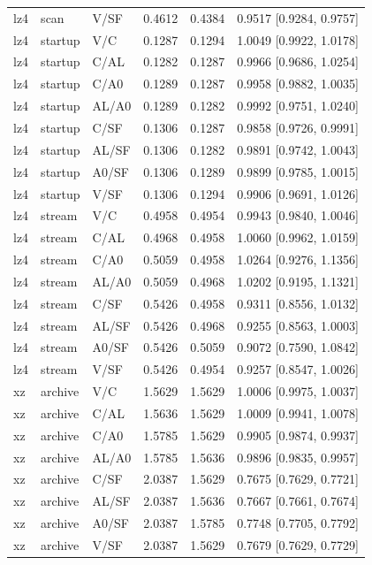 \begin{longtable}{lllrrl}
lz4 & scan & V/SF & 0.4612 & 0.4384 & 0.9517 [0.9284, 0.9757] \\
lz4 & startup & V/C & 0.1287 & 0.1294 & 1.0049 [0.9922, 1.0178] \\
lz4 & startup & C/AL & 0.1282 & 0.1287 & 0.9966 [0.9686, 1.0254] \\
lz4 & startup & C/A0 & 0.1289 & 0.1287 & 0.9958 [0.9882, 1.0035] \\
lz4 & startup & AL/A0 & 0.1289 & 0.1282 & 0.9992 [0.9751, 1.0240] \\
lz4 & startup & C/SF & 0.1306 & 0.1287 & 0.9858 [0.9726, 0.9991] \\
lz4 & startup & AL/SF & 0.1306 & 0.1282 & 0.9891 [0.9742, 1.0043] \\
lz4 & startup & A0/SF & 0.1306 & 0.1289 & 0.9899 [0.9785, 1.0015] \\
lz4 & startup & V/SF & 0.1306 & 0.1294 & 0.9906 [0.9691, 1.0126] \\
lz4 & stream & V/C & 0.4958 & 0.4954 & 0.9943 [0.9840, 1.0046] \\
lz4 & stream & C/AL & 0.4968 & 0.4958 & 1.0060 [0.9962, 1.0159] \\
lz4 & stream & C/A0 & 0.5059 & 0.4958 & 1.0264 [0.9276, 1.1356] \\
lz4 & stream & AL/A0 & 0.5059 & 0.4968 & 1.0202 [0.9195, 1.1321] \\
lz4 & stream & C/SF & 0.5426 & 0.4958 & 0.9311 [0.8556, 1.0132] \\
lz4 & stream & AL/SF & 0.5426 & 0.4968 & 0.9255 [0.8563, 1.0003] \\
lz4 & stream & A0/SF & 0.5426 & 0.5059 & 0.9072 [0.7590, 1.0842] \\
lz4 & stream & V/SF & 0.5426 & 0.4954 & 0.9257 [0.8547, 1.0026] \\
xz & archive & V/C & 1.5629 & 1.5629 & 1.0006 [0.9975, 1.0037] \\
xz & archive & C/AL & 1.5636 & 1.5629 & 1.0009 [0.9941, 1.0078] \\
xz & archive & C/A0 & 1.5785 & 1.5629 & 0.9905 [0.9874, 0.9937] \\
xz & archive & AL/A0 & 1.5785 & 1.5636 & 0.9896 [0.9835, 0.9957] \\
xz & archive & C/SF & 2.0387 & 1.5629 & 0.7675 [0.7629, 0.7721] \\
xz & archive & AL/SF & 2.0387 & 1.5636 & 0.7667 [0.7661, 0.7674] \\
xz & archive & A0/SF & 2.0387 & 1.5785 & 0.7748 [0.7705, 0.7792] \\
xz & archive & V/SF & 2.0387 & 1.5629 & 0.7679 [0.7629, 0.7729] \\

\end{longtable}
